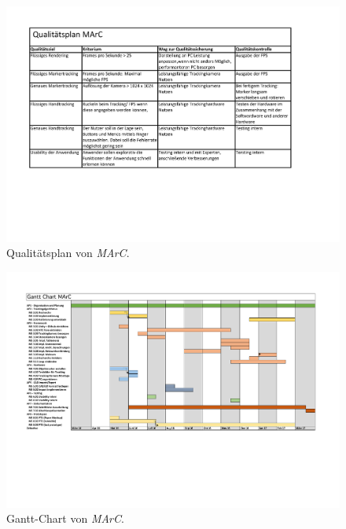 \begin{figure}[htbp]
	\centering
	\includegraphics[angle=90,scale=.9, trim=1cm 2.5cm 3.5cm 0cm, clip]{kapitel/anhang/Qualitaetsplan.pdf}
	 \caption[Qualitätsplan von \textit{MArC}]{Qualitätsplan von \textit{MArC}.}
	\label{fig:qualitaetsplan}
\end{figure}
\newpage

\begin{figure}[htbp]
	\centering
	\includegraphics[angle=90,scale=.8, trim=1cm 4cm 2cm 0cm, clip]{kapitel/anhang/GanttChart.pdf}
	 \caption[Gantt-Chart von \textit{MArC}]{Gantt-Chart von \textit{MArC}.}
	\label{fig:ganttchart}
\end{figure}
\newpage

